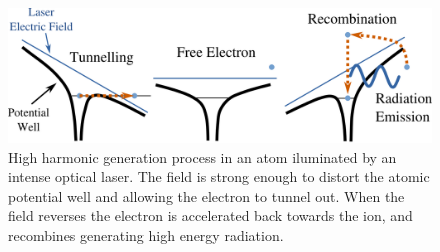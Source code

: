 \begin{figure}[h]
\centering
  \includegraphics[width=1.0 \columnwidth]{HHG_Picture1.png}
  \caption{High harmonic generation process in an atom iluminated by an intense
    optical laser. The field is strong enough to distort the atomic potential
    well and allowing the electron to tunnel out. When the field reverses the
    electron is accelerated back towards the ion, and recombines generating high
    energy radiation.}
  \label{Fig:HHG_Process}
\end{figure}


